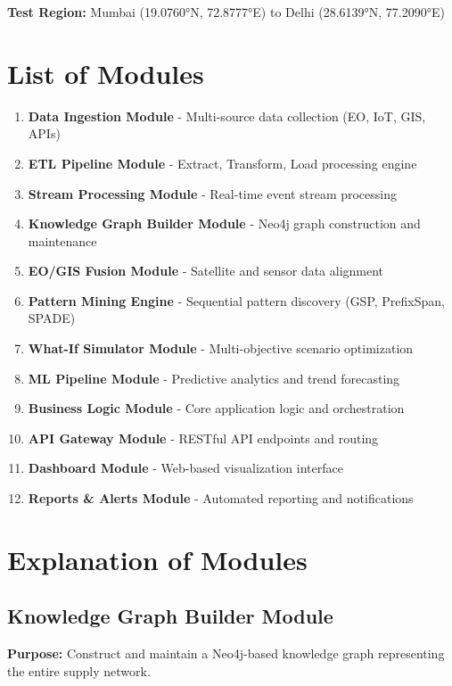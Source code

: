 \documentclass[11pt,a4paper]{article}
\begin{document}
\textbf{Test Region:} Mumbai (19.0760°N, 72.8777°E) to Delhi (28.6139°N, 77.2090°E)

\section{List of Modules}

\begin{enumerate}
    \item \textbf{Data Ingestion Module} - Multi-source data collection (EO, IoT, GIS, APIs)
    \item \textbf{ETL Pipeline Module} - Extract, Transform, Load processing engine
    \item \textbf{Stream Processing Module} - Real-time event stream processing
    \item \textbf{Knowledge Graph Builder Module} - Neo4j graph construction and maintenance
    \item \textbf{EO/GIS Fusion Module} - Satellite and sensor data alignment
    \item \textbf{Pattern Mining Engine} - Sequential pattern discovery (GSP, PrefixSpan, SPADE)
    \item \textbf{What-If Simulator Module} - Multi-objective scenario optimization
    \item \textbf{ML Pipeline Module} - Predictive analytics and trend forecasting
    \item \textbf{Business Logic Module} - Core application logic and orchestration
    \item \textbf{API Gateway Module} - RESTful API endpoints and routing
    \item \textbf{Dashboard Module} - Web-based visualization interface
    \item \textbf{Reports \& Alerts Module} - Automated reporting and notifications
\end{enumerate}

\section{Explanation of Modules}

\subsection{Knowledge Graph Builder Module}

\textbf{Purpose:} Construct and maintain a Neo4j-based knowledge graph representing the entire supply network.
\end{document}
